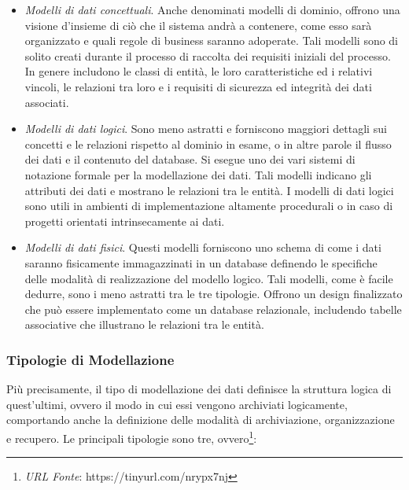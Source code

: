 \begin{itemize}
    \item \textit{Modelli di dati concettuali}. Anche denominati modelli di dominio, offrono una visione d'insieme di ciò che il sistema andrà a contenere, come esso sarà organizzato e quali regole di business saranno adoperate. Tali modelli sono di solito creati durante il processo di raccolta dei requisiti iniziali del processo. In genere includono le classi di entità, le loro caratteristiche ed i relativi vincoli, le relazioni tra loro e i requisiti di sicurezza ed integrità dei dati associati.
    \item \textit{Modelli di dati logici}. Sono meno astratti e forniscono maggiori dettagli sui concetti e le relazioni rispetto al dominio in esame, o in altre parole il flusso dei dati e il contenuto del database. Si esegue uno dei vari sistemi di notazione formale per la modellazione dei dati. Tali modelli indicano gli attributi dei dati e mostrano le relazioni tra le entità. I modelli di dati logici sono utili in ambienti di implementazione altamente procedurali o in caso di progetti orientati intrinsecamente ai dati.
    \item \textit{Modelli di dati fisici}. Questi modelli forniscono uno schema di come i dati saranno fisicamente immagazzinati in un database definendo le specifiche delle modalità di realizzazione del modello logico. Tali modelli, come è facile dedurre, sono i meno astratti tra le tre tipologie. Offrono un design finalizzato che può essere implementato come un database relazionale, includendo tabelle associative che illustrano le relazioni tra le entità.
\end{itemize}

\subsubsection{Tipologie di Modellazione}

Più precisamente, il tipo di modellazione dei dati definisce la struttura logica di quest'ultimi, ovvero il modo in cui essi vengono archiviati logicamente, comportando anche la definizione delle modalità di archiviazione, organizzazione e recupero. Le principali tipologie sono tre, ovvero\footnote{\textit{URL Fonte}: https://tinyurl.com/nrypx7nj}:

